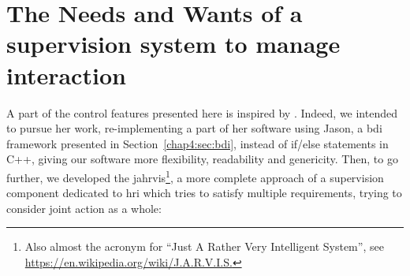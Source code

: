 \documentclass[a4paper,11pt,twoside]{StyleThese}
\begin{document}
\section{The Needs and Wants of a supervision system to manage interaction} %


A part of the control features presented here is inspired by \cite{devin_2017_decisional}. Indeed, we intended to pursue her work, re-implementing a part of her software using Jason, a \acrshort{bdi} framework presented in Section~\ref{chap4:sec:bdi}, instead of if/else statements in C++, giving our software more flexibility, readability and genericity.
Then, to go further, we developed the \acrfull{jahrvis}\footnote{Also almost the acronym for ``Just A Rather Very Intelligent System'', see \url{https://en.wikipedia.org/wiki/J.A.R.V.I.S.}}, a more complete approach of a supervision component dedicated to \acrshort{hri} which tries to satisfy multiple requirements, trying to consider joint action as a whole:
\end{document}
